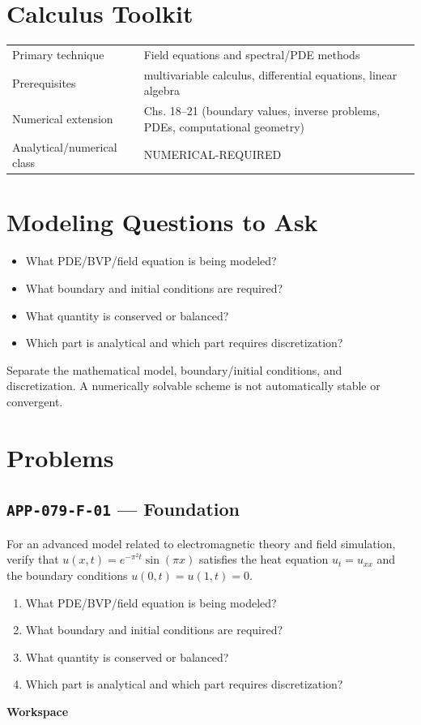 \documentclass[11pt]{book}
\newcommand{\pid}[1]{\texttt{#1}}
\newcommand{\workspace}{\par\vspace{0.7in}\hrulefill\par\vspace{0.55in}\hrulefill\par}
\begin{document}
\section*{Calculus Toolkit}
\begin{tabularx}{\textwidth}{@{}lX@{}}\toprule
Primary technique & Field equations and spectral/PDE methods \\
Prerequisites & multivariable calculus, differential equations, linear algebra \\
Numerical extension & Chs. 18–21 (boundary values, inverse problems, PDEs, computational geometry) \\
Analytical/numerical class & NUMERICAL-REQUIRED \\
\bottomrule\end{tabularx}
\section*{Modeling Questions to Ask}\begin{itemize}
\item What PDE/BVP/field equation is being modeled?
\item What boundary and initial conditions are required?
\item What quantity is conserved or balanced?
\item Which part is analytical and which part requires discretization?
\end{itemize}
\begin{errorbox}Separate the mathematical model, boundary/initial conditions, and discretization. A numerically solvable scheme is not automatically stable or convergent.\end{errorbox}
\section*{Problems}
\subsection*{\pid{APP-079-F-01} — Foundation}
\begin{problembox}
For an advanced model related to electromagnetic theory and field simulation, verify that $u(x,t)=e^{-\pi^2t}\sin(\pi x)$ satisfies the heat equation $u_t=u_{xx}$ and the boundary conditions $u(0,t)=u(1,t)=0$.
\end{problembox}
\begin{promptbox}\begin{enumerate}
\item What PDE/BVP/field equation is being modeled?
\item What boundary and initial conditions are required?
\item What quantity is conserved or balanced?
\item Which part is analytical and which part requires discretization?
\end{enumerate}\end{promptbox}
\textbf{Workspace}\workspace
{}
\end{document}
